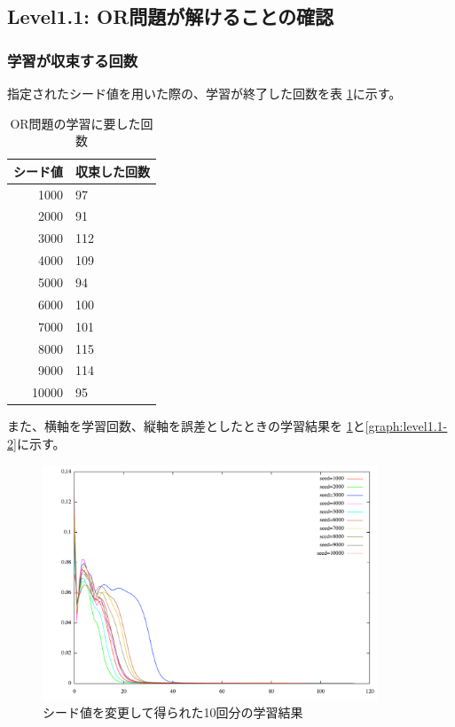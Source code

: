 \subsection{Level1.1: OR問題が解けることの確認}
\subsubsection{学習が収束する回数}
指定されたシード値を用いた際の、学習が終了した回数を表
\ref{table:level1.1}に示す。

\begin{table}[htb]
 \begin{center}
  \caption{OR問題の学習に要した回数}
  \label{table:level1.1}
  \begin{tabular}[htb]{r|l} \hline
   シード値 & 収束した回数 \\ \hline \hline
   1000 & 97 \\ \hline
   2000 & 91 \\ \hline
   3000 & 112 \\ \hline
   4000 & 109 \\ \hline
   5000 & 94 \\ \hline
   6000 & 100 \\ \hline
   7000 & 101 \\ \hline
   8000 & 115 \\ \hline
   9000 & 114 \\ \hline
   10000 & 95 \\ \hline
  \end{tabular}
 \end{center}
\end{table}

また、横軸を学習回数、縦軸を誤差としたときの学習結果を
\ref{graph:level1.1-1}と\ref{graph:level1.1-2}に示す。

\begin{figure}[h]
 \begin{center}
  \includegraphics[width=10.0cm]{figs/ex.pdf}
  \caption{シード値を変更して得られた10回分の学習結果}
  \label{graph:level1.1-1}
 \end{center}
\end{figure}


